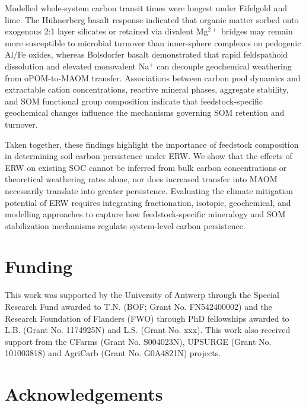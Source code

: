 \documentclass[preprint,12pt]{elsarticle}
\begin{document}
Modelled whole-system carbon transit times were longest under Eifelgold and lime. The H\"uhnerberg basalt response indicated that organic matter sorbed onto exogenous 2:1 layer silicates or retained via divalent Mg$^{2+}$ bridges may remain more susceptible to microbial turnover than inner-sphere complexes on pedogenic Al/Fe oxides, whereas Bolsdorfer basalt demonstrated that rapid feldspathoid dissolution and elevated monovalent Na$^{+}$ can decouple geochemical weathering from oPOM-to-MAOM transfer. Associations between carbon pool dynamics and extractable cation concentrations, reactive mineral phases, aggregate stability, and SOM functional group composition indicate that feedstock-specific geochemical changes influence the mechanisms governing SOM retention and turnover.
  
Taken together, these findings highlight the importance of feedstock composition in determining soil carbon persistence under ERW. We show that the effects of ERW on existing SOC cannot be inferred from bulk carbon concentrations or theoretical weathering rates alone, nor does increased transfer into MAOM necessarily translate into greater persistence. Evaluating the climate mitigation potential of ERW requires integrating fractionation, isotopic, geochemical, and modelling approaches to capture how feedstock-specific mineralogy and SOM stabilization mechanisms regulate system-level carbon persistence.




\section*{Funding}
This work was supported by the University of Antwerp through the Special Research Fund  awarded to T.N. (BOF; Grant No. FN542400002) and the Research Foundation of Flanders (FWO) through PhD fellowships awarded to L.B. (Grant No. 1174925N) and L.S. (Grant No. xxx). This work also received support from the C\-Farms (Grant No. S004023N), UPSURGE (Grant No. 101003818) and AgriCarb (Grant No. G0A4821N) projects.

\section*{Acknowledgements}
\end{document}
